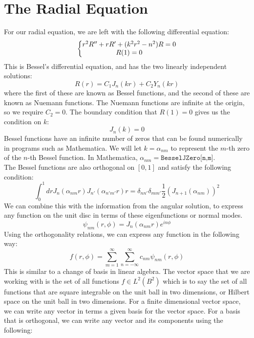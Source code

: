 \documentclass{paper}
\begin{document}
\section{The Radial Equation}
For our radial equation, we are left with the following differential equation:
\begin{equation}\left\{\begin{matrix}
    r^2 R''+r R'+(k^2 r^2 - n^2 )R=0 \\
    R(1)=0
 \end{matrix}\right.\end{equation}
This is Bessel's differential equation, and has the two linearly independent solutions:
\begin{equation}R(r)=C_1 J_n(kr)+C_2 Y_n(k r)\end{equation}
where the first of these are known as Bessel functions, and the second of these are known as Nuemann functions. The Nuemann functions are infinite at the origin, so we require $C_2=0$. The boundary condition that $R(1)=0$ gives us the condition on $k$:
\begin{equation}J_n(k)=0\end{equation}
Bessel functions have an infinite number of zeros that can be found numerically in programs such as Mathematica. We will let $k=\alpha_{nm}$ to represent the $m$-th zero of the $n$-th Bessel function. In Mathematica, $\alpha_{nm}=\texttt{BesselJZero[n,m]}$.\\
The Bessel functions are also orthogonal on $[0,1]$ and satisfy the following condition:
\begin{equation}\int_0^1 dr J_n(\alpha_{nm} r)J_{n'}(\alpha_{n'm'} r)r=\delta_{nn'}\delta_{mm'}\frac{1}{2}(J_{n+1}(\alpha_{nm}))^2
\end{equation}
We can combine this with the information from the angular solution, to express any function on the unit disc in terms of these eigenfunctions or normal modes.
\begin{equation}
\psi_{nm}(r,\phi)=J_n(\alpha_{nm} r)e^{in\phi}\end{equation}
Using the orthogonality relations, we can express any function in the following way:
\begin{equation}f(r,\phi)=\sum_{m=1}^\infty \sum_{n=-\infty}^\infty  c_{nm}\psi_{nm}(r,\phi)\end{equation}
This is similar to a change of basis in linear algebra. The vector space that we are working with is the set of all functions $f\in L^2(B^2)$ which is to say the set of all functions that are square integrable on the unit ball in two dimensions, or Hilbert space on the unit ball in two dimensions. For a finite dimensional vector space, we can write any vector in terms a given basis for the vector space. For a basis that is orthogonal, we can write any vector and its components using the following:
\end{document}
